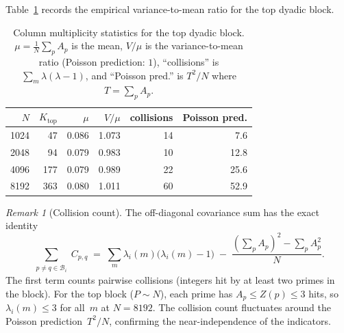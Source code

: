 \documentclass[11pt]{article}
\theoremstyle{definition}
\theoremstyle{remark}
\newtheorem{remark}[theorem]{Remark}
\begin{document}
Table~\ref{tab:poisson} records the empirical
variance-to-mean ratio for the top dyadic block.

\begin{table}[ht]
\centering
\begin{tabular}{rrrrrr}
\toprule
$N$ & $K_{\mathrm{top}}$ & $\mu$ & $V/\mu$ & collisions & Poisson pred. \\
\midrule
1024 &  47 & 0.086 & 1.073 &  14 &  7.6 \\
2048 &  94 & 0.079 & 0.983 &  10 & 12.8 \\
4096 & 177 & 0.079 & 0.989 &  22 & 25.6 \\
8192 & 363 & 0.080 & 1.011 &  60 & 52.9 \\
\bottomrule
\end{tabular}
\caption{Column multiplicity statistics for the
top dyadic block.
$\mu = \tfrac{1}{N}\sum_p A_p$ is the mean,
$V/\mu$ is the variance-to-mean ratio
(Poisson prediction: $1$),
``collisions'' is $\sum_m \lambda(\lambda-1)$,
and ``Poisson pred.'' is $T^2/N$
where $T = \sum_p A_p$.}
\label{tab:poisson}
\end{table}

\begin{remark}[Collision count]
\label{rem:poisson-collision}
The off-diagonal covariance sum has the exact
identity
\[
  \sum_{\substack{p \neq q \in \mathcal{B}_i}}
  C_{p,q}
  \;=\;
  \sum_m \lambda_i(m)\bigl(\lambda_i(m) - 1\bigr)
  \;-\;
  \frac{(\sum_p A_p)^2 - \sum_p A_p^2}{N}.
\]
The first term counts pairwise collisions
(integers hit by at least two primes in the
block).
For the top block ($P \sim N$), each prime has
$A_p \le Z(p) \le 3$ hits, so
$\lambda_i(m) \le 3$ for all~$m$ at $N = 8192$.
The collision count fluctuates around the
Poisson prediction~$T^2/N$,
confirming the near-independence of the
indicators.
\end{remark}
\end{document}
